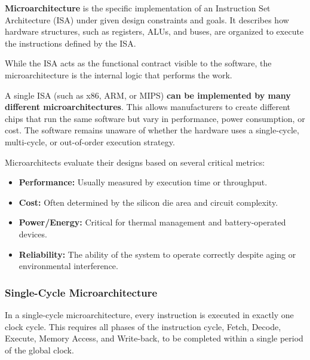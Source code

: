 \begin{definition}
	\textbf{Microarchitecture} is the specific implementation of an Instruction Set Architecture (ISA) under given design constraints and goals. It describes how hardware structures, such as registers, ALUs, and buses, are organized to execute the instructions defined by the ISA.
\end{definition}

\begin{remark}
	While the ISA acts as the functional contract visible to the software, the microarchitecture is the internal logic that performs the work.
\end{remark}

\begin{important}
	A single ISA (such as x86, ARM, or MIPS) \textbf{can be implemented by many different microarchitectures}. This allows manufacturers to create different chips that run the same software but vary in performance, power consumption, or cost. The software remains unaware of whether the hardware uses a single-cycle, multi-cycle, or out-of-order execution strategy.
\end{important}

\begin{remark}
	Microarchitects evaluate their designs based on several critical metrics:
	\begin{itemize}
		\item \textbf{Performance:} Usually measured by execution time or throughput.
		\item \textbf{Cost:} Often determined by the silicon die area and circuit complexity.
		\item \textbf{Power/Energy:} Critical for thermal management and battery-operated devices.
		\item \textbf{Reliability:} The ability of the system to operate correctly despite aging or environmental interference.
	\end{itemize}
\end{remark}

\subsubsection{Single-Cycle Microarchitecture}

\begin{definition}
	In a single-cycle microarchitecture, every instruction is executed in exactly one clock cycle. This requires all phases of the instruction cycle, Fetch, Decode, Execute, Memory Access, and Write-back, to be completed within a single period of the global clock.
\end{definition}


